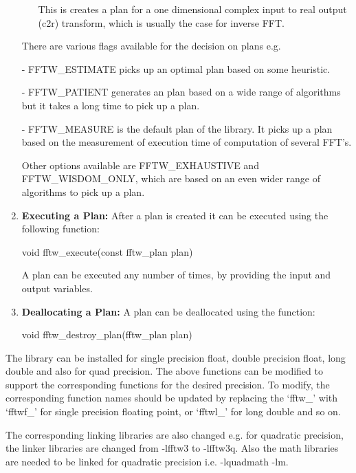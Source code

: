 \begin{enumerate}
\begin{itemize}
This is creates a plan for a one dimensional complex input to real output (c2r) transform, which is usually the case for inverse FFT.
\end{itemize}
There are various flags available for the decision on plans e.g. 

- FFTW\_ESTIMATE picks up an optimal plan based on some heuristic.

- FFTW\_PATIENT generates an plan based on a wide range of algorithms but it takes a long time to pick up a plan.

- FFTW\_MEASURE is the default plan of the library. It picks up a plan based on the measurement of execution time of computation of several FFT's.

Other options available are FFTW\_EXHAUSTIVE and FFTW\_WISDOM\_ONLY, which are based on an even wider range of algorithms to pick up a plan. 
\item
\textbf{Executing a Plan:} After a plan is created it can be executed using the following function:

void fftw\_execute(const fftw\_plan plan)

A plan can be executed any number of times, by providing the input and output variables.
\item
\textbf{Deallocating a Plan:} A plan can be deallocated using the function:

void fftw\_destroy\_plan(fftw\_plan plan)

 \end{enumerate}
 The library can be installed for single precision float, double precision float, long double and also for quad precision. The above functions can be modified to support the corresponding functions for the desired precision. To modify, the corresponding function names should be updated by replacing the ‘fftw\_’ with ‘fftwf\_’ for single precision floating point, or ‘fftwl\_’ for long double and so on.
 
 \noindent The corresponding linking libraries are also changed e.g. for quadratic precision, the linker libraries are changed from -lfftw3 to -lfftw3q. Also the math libraries are needed to be linked for quadratic precision i.e. -lquadmath -lm. 
